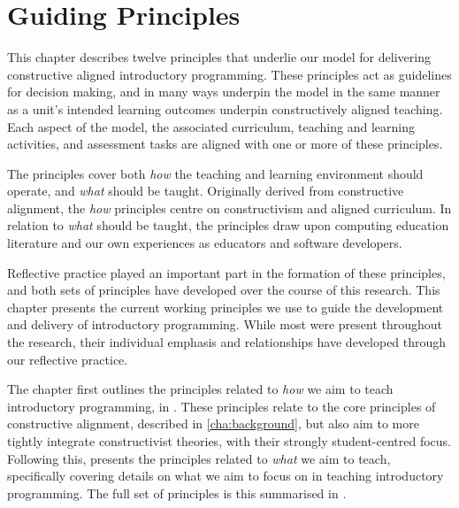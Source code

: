 
\chapter{Guiding Principles} %
\label{cha:guiding_principles}

\graphicspath{{Figures/CAApproach/}}

%
%

This chapter describes twelve principles that underlie our model for delivering constructive aligned introductory programming. These principles act as guidelines for decision making, and in many ways underpin the model in the same manner as a unit's intended learning outcomes underpin constructively aligned teaching. Each aspect of the model, the associated curriculum, teaching and learning activities, and assessment tasks are aligned with one or more of these principles. 

The principles cover both \emph{how} the teaching and learning environment should operate, and \emph{what} should be taught. Originally derived from constructive alignment, the \emph{how} principles centre on constructivism and aligned curriculum. In relation to \emph{what} should be taught, the principles draw upon computing education literature and our own experiences as educators and software developers. 

Reflective practice played an important part in the formation of these principles, and both sets of principles have developed over the course of this research. This chapter presents the current working principles we use to guide the development and delivery of introductory programming. While most were present throughout the research, their individual emphasis and relationships have developed through our reflective practice. 

%

The chapter first outlines the principles related to \emph{how} we aim to teach introductory programming, in . These principles relate to the core principles of constructive alignment, described in \cref{cha:background}, but also aim to more tightly integrate constructivist theories, with their strongly student-centred focus. Following this,  presents the principles related to \emph{what} we aim to teach, specifically covering details on what we aim to focus on in teaching introductory programming. The full set of principles is this summarised in .


